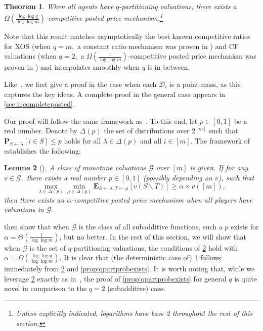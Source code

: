 \documentclass[11pt]{article}%
\newtheorem{theorem}{Theorem}
\newtheorem{lemma}[theorem]{Lemma}
\numberwithin{theorem}{subsection}
\newcommand{\prob}{\mathbf{P}}
\newcommand{\expect}{\mathbf{E}}
\begin{document}
\begin{theorem}
\label{thm:postedpriceqpart}
    When all agents have $q$-partitioning valuations, there exists a
    $\Omega(\frac{\log \log q}{\log \log m})$-competitive
    posted price mechanism.\footnote{Unless explicitly indicated, logarithms have base 2 throughout the rest of this section.}
\end{theorem}

Note that this result matches asymptotically the best known competitive ratios for XOS (when $q = m,$ a constant ratio mechanism was proven in \cite{FeldmanGL15}) and CF valuations (when $q = 2,$ a $\Omega(\frac{1}{\log \log m})$-competitive posted price mechanism was proven in \cite{DuttingKL20}) and interpolates smoothly when $q$ is in between.

Like~\cite{DuttingKL20}, we first give a proof in the case when each $\mathcal{D}_i$ is a point-mass, as this captures the key ideas. A complete proof in the general case appears in \cref{sec:incompleteposted}.

Our proof will follow the same framework as~\cite{DuttingKL20}. To this end, let $p \in [0,1]$ be a real number. Denote by $\Delta(p)$ the set of distributions over $2^{[m]}$ such that $\prob_{S\leftarrow \lambda}[i \in S]\le p$ holds for all $\lambda \in \Delta(p)$ and all 
$i \in [m]$. The framework of~\cite{DuttingKL20} establishes the following:

\begin{lemma}[{\cite[Eq. (6)]{DuttingKL20}}]
\label{lem:minimaxgame}
A class of monotone valuations $\mathcal{G}$ over $[m]$ is given. If for any $v\in \mathcal{G},$ there exists a real number $p \in [0,1]$ (possibly depending on $v$), such that 
$$
\max_{\lambda\in \Delta(p)}
\min_{\mu \in \Delta(p)}\expect_{S\leftarrow \lambda, T\leftarrow \mu}[v(S\backslash T)]\ge 
\alpha \times v([m]),
$$
then there exists an $\alpha$-competitive posted price mechanism when all players have valuations in $\mathcal{G}.$
\end{lemma}

\cite{DuttingKL20} then show that when $\mathcal{G}$ is the class of all subadditive functions, such a $p$ exists for \linebreak $\alpha = \Theta(\frac{1}{\log \log m})$, but no better. In the rest of this section, we will show that when $\mathcal{G}$ is the set of $q$-partitioning valuations, the conditions of 
\cref{lem:minimaxgame} hold with $\alpha = \Omega \left(\frac{\log \log q}{\log \log m}\right)$. It is clear that (the deterministic case of) \cref{thm:postedpriceqpart} follows immediately from \cref{lem:minimaxgame} and \cref{prop:qpartprobexists}. It is worth noting that, while we leverage \cref{lem:minimaxgame} exactly as in~\cite{DuttingKL20}, the proof of \cref{prop:qpartprobexists} for general $q$ is quite novel in comparison to the $q=2$ (subadditive) case.
\end{document}
